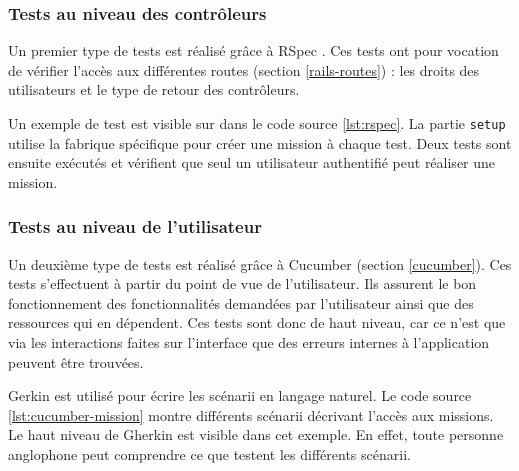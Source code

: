 \subsubsection{Tests au niveau des contrôleurs}
Un premier type de tests est réalisé grâce à RSpec \cite{rspec}. Ces tests ont pour vocation de vérifier l'accès aux différentes routes (section \ref{rails-routes}) : les droits des utilisateurs et le type de retour des contrôleurs.

Un exemple de test est visible sur dans le code source \ref{lst:rspec}. La partie \texttt{setup} utilise la fabrique spécifique pour créer une \gls{mission} à chaque test. Deux tests sont ensuite exécutés et vérifient que seul un utilisateur authentifié peut réaliser une \gls{mission}.

\begin{figure}

\end{figure}

\subsubsection{Tests au niveau de l'utilisateur}
Un deuxième type de tests est réalisé grâce à Cucumber (section \ref{cucumber}). Ces tests s'effectuent à partir du point de vue de l'utilisateur. Ils assurent le bon fonctionnement des fonctionnalités demandées par l'utilisateur ainsi que des ressources qui en dépendent. Ces tests sont donc de haut niveau, car ce n'est que via les interactions faites sur l'interface que des erreurs internes à l'application peuvent être trouvées.

\begin{figure}

\end{figure}

\begin{figure}

\end{figure}

Gerkin est utilisé pour écrire les scénarii en langage naturel.
Le code source \ref{lst:cucumber-mission} montre différents scénarii décrivant l'accès aux \glspl{mission}. Le haut niveau de Gherkin est visible dans cet exemple. En effet, toute personne anglophone peut comprendre ce que testent les différents scénarii.

